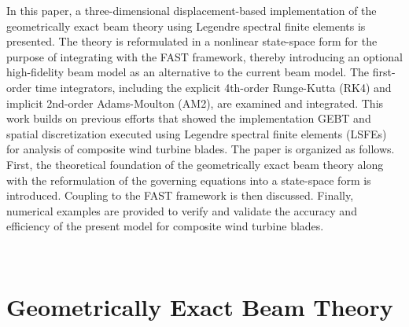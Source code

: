 \documentclass{aiaa-tc}
\begin{document}
In this paper, a three-dimensional displacement-based
implementation of the geometrically exact beam theory using Legendre
spectral finite elements is presented. The theory is reformulated in a
nonlinear state-space form for the purpose of integrating with the FAST
framework, thereby introducing an optional high-fidelity beam model as an
alternative to the current beam model. The first-order time integrators, including the explicit 4th-order Runge-Kutta (RK4) and implicit 2nd-order Adams-Moulton (AM2), are examined and integrated. This work builds on previous efforts
that showed the implementation GEBT and spatial discretization executed
using Legendre spectral finite elements
(LSFEs)\cite{Wang:GEBT2013,Wang:SFE2013,Wang:GEBT2014,Sprague:FAST2014} for
analysis of composite wind turbine blades. The paper is organized as
follows.  First, the theoretical foundation of the geometrically exact beam
theory along with the reformulation of the governing equations into a
state-space form is introduced. Coupling to the FAST framework is then
discussed. Finally, numerical examples are
provided to verify and validate the accuracy and efficiency of the present model for
composite wind turbine blades. 

~

\section{Geometrically Exact Beam Theory}
\end{document}
